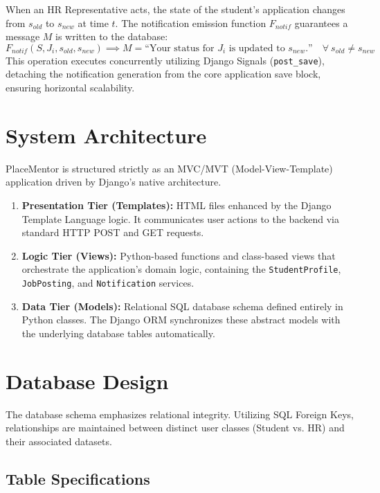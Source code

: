 \documentclass[a4paper,12pt]{report}
\begin{document}
When an HR Representative acts, the state of the student's application changes from $s_{old}$ to $s_{new}$ at time $t$. The notification emission function $F_{notif}$ guarantees a message $M$ is written to the database:
\begin{equation}
F_{notif}(S, J_i, s_{old}, s_{new}) \implies M = \text{“Your status for } J_i \text{ is updated to } s_{new}\text{.”} \quad \forall \ s_{old} \neq s_{new}
\end{equation}
This operation executes concurrently utilizing Django Signals (\texttt{post\_save}), detaching the notification generation from the core application save block, ensuring horizontal scalability.

\section{System Architecture}

PlaceMentor is structured strictly as an MVC/MVT (Model-View-Template) application driven by Django's native architecture.

\begin{enumerate}
    \item \textbf{Presentation Tier (Templates):} HTML files enhanced by the Django Template Language logic. It communicates user actions to the backend via standard HTTP POST and GET requests.
    \item \textbf{Logic Tier (Views):} Python-based functions and class-based views that orchestrate the application's domain logic, containing the \texttt{StudentProfile}, \texttt{JobPosting}, and \texttt{Notification} services.
    \item \textbf{Data Tier (Models):} Relational SQL database schema defined entirely in Python classes. The Django ORM synchronizes these abstract models with the underlying database tables automatically.
\end{enumerate}

\section{Database Design}

The database schema emphasizes relational integrity. Utilizing SQL Foreign Keys, relationships are maintained between distinct user classes (Student vs. HR) and their associated datasets.

\subsection{Table Specifications}
\end{document}
